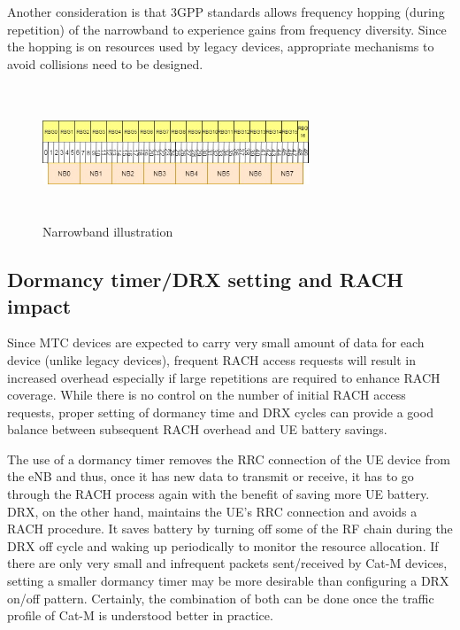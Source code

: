 \documentclass[conference,compsoc]{IEEEtran}
\begin{document}
Another consideration is that 3GPP standards allows frequency hopping (during repetition) of the narrowband  to experience gains from frequency diversity. Since the hopping is on resources used by legacy devices, appropriate mechanisms to avoid collisions need to be designed.

\begin{figure}[htbp]
\centerline{\includegraphics[height=40mm,width=80mm]{narrowband.png}}
\caption{Narrowband illustration}
\label{fig_narrowband}
\end{figure}


\subsection{Dormancy timer/DRX setting and RACH impact}
 Since MTC devices are expected to carry very small amount of data for each device (unlike legacy devices), frequent RACH access requests will result in increased overhead especially if large repetitions are required to enhance RACH coverage. While there is no control on the number of initial RACH access requests, proper setting of dormancy time and DRX cycles can provide a good balance between subsequent RACH overhead and UE battery savings.

 The use of a dormancy timer removes the RRC connection of the UE device from the eNB and thus, once it has new data to transmit or receive, it has to go through the RACH process again with the benefit of saving more UE battery. DRX, on the other hand, maintains the UE’s RRC connection and avoids  a RACH procedure. It saves battery by turning off some of the RF chain during the DRX off cycle and waking up periodically to monitor the resource allocation. If there are only very small and infrequent packets sent/received by Cat-M devices, setting a smaller dormancy timer may be more desirable than configuring a DRX on/off pattern. Certainly, the combination of both can be done once the traffic profile of Cat-M is understood better in practice.
\end{document}
